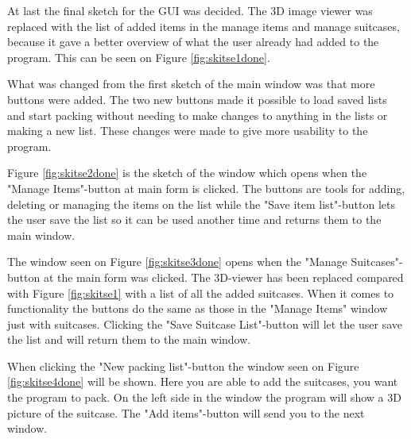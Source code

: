 At last the final sketch for the GUI was decided. The 3D image viewer was replaced with the list of added items in the manage items and manage suitcases, because it gave a better overview of what the user already had added to the program. This can be seen on Figure \ref{fig:skitse1done}.


What was changed from the first sketch of the main window was that more buttons were added. The two new buttons made it possible to load saved lists and start packing without needing to make changes to anything in the lists or making a new list.
These changes were made to give more usability to the program.


Figure \ref{fig:skitse2done} is the sketch of the window which opens when the "Manage Items"-button at main form is clicked. The buttons are tools for adding, deleting or managing the items on the list while the "Save item list"-button lets the user save the list so it can be used another time and returns them to the main window.


The window seen on Figure \ref{fig:skitse3done} opens when the "Manage Suitcases"-button at the main form was clicked. The 3D-viewer has been replaced compared with Figure \ref{fig:skitse1} with a list of all the added suitcases. When it comes to functionality the buttons do the same as those in the "Manage Items" window just with suitcases. Clicking the "Save Suitcase List"-button will let the user save the list and will return them to the main window.


When clicking the "New packing list"-button the window seen on Figure \ref{fig:skitse4done} will be shown. Here you are able to add the suitcases, you want the program to pack. On the left side in the window the program will show a 3D picture of the suitcase. The "Add items"-button will send you to the next window.


